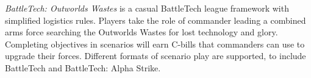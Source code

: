 \emph{BattleTech: Outworlds Wastes} is a casual BattleTech league framework with simplified logistics rules.
Players take the role of commander leading a combined arms force searching the Outworlds Wastes for lost technology and glory.
Completing objectives in scenarios will earn C-bills that commanders can use to upgrade their forces.
Different formats of scenario play are supported, to include BattleTech and BattleTech: Alpha Strike.
